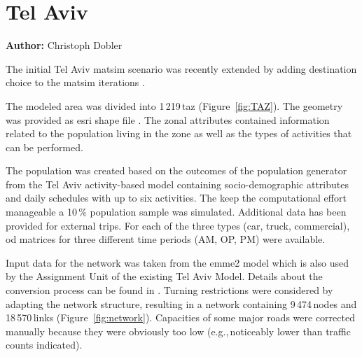 \section{Tel Aviv}
\label{sec:telaviv}
\hfill \textbf{Author:} Christoph Dobler

The initial Tel Aviv \gls{matsim} scenario \citep[][]{BekhorEtAl_TRB_2011} was recently extended by adding destination choice to the \gls{matsim} iterations \citep[][]{DoblerEtAl_TechRep_IVT_2014}.

The modeled area was divided into 1\,219\,\gls{taz} (Figure~\ref{fig:TAZ}). The geometry was provided as \gls{esri} shape file \citep{ESRI-ShapeFile_manual_1998}. The zonal attributes contained information related to the population living in the zone as well as the types of activities that can be performed.

The population was created based on the outcomes of the population generator from the Tel Aviv activity-based model containing socio-demographic attributes and daily schedules with up to six activities. The keep the computational effort manageable a 10\,\% population sample was simulated. Additional data has been provided for external trips. For each of the three types (car, truck, commercial), \gls{od} matrices for three different time periods (AM, OP, PM) were available.

Input data for the network was taken from the \gls{emme2} model \citep[see][]{EMME_Webpage_2011} which is also used by the Assignment Unit of the existing Tel Aviv Model. Details about the conversion process can be found in \citet{GaoWEtAl_TRR_2010}. Turning restrictions were considered by adapting the network structure, resulting in a network containing 9\,474\,nodes and 18\,570\,links (Figure~\ref{fig:network}). Capacities of some major roads were corrected manually because they were obviously too low (e.g.,\,noticeably lower than traffic counts indicated).

